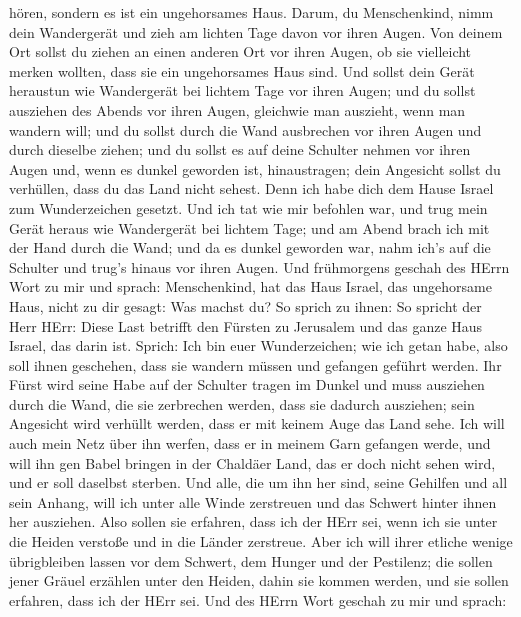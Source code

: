 hören, sondern es ist ein ungehorsames Haus.  Darum, du
Menschenkind, nimm dein Wandergerät und zieh am lichten Tage davon vor
ihren Augen. Von deinem Ort sollst du ziehen an einen anderen Ort vor
ihren Augen, ob sie vielleicht merken wollten, dass sie ein ungehorsames
Haus sind.  Und sollst dein Gerät heraustun wie Wandergerät
bei lichtem Tage vor ihren Augen; und du sollst ausziehen des Abends vor
ihren Augen, gleichwie man auszieht, wenn man wandern will; 
und du sollst durch die Wand ausbrechen vor ihren Augen und durch
dieselbe ziehen;  und du sollst es auf deine Schulter nehmen
vor ihren Augen und, wenn es dunkel geworden ist, hinaustragen; dein
Angesicht sollst du verhüllen, dass du das Land nicht sehest. Denn ich
habe dich dem Hause Israel zum Wunderzeichen gesetzt.  Und
ich tat wie mir befohlen war, und trug mein Gerät heraus wie Wandergerät
bei lichtem Tage; und am Abend brach ich mit der Hand durch die Wand;
und da es dunkel geworden war, nahm ich's auf die Schulter und trug's
hinaus vor ihren Augen.  Und frühmorgens geschah des HErrn
Wort zu mir und sprach:  Menschenkind, hat das Haus Israel,
das ungehorsame Haus, nicht zu dir gesagt: Was machst du? 
So sprich zu ihnen: So spricht der Herr HErr: Diese Last betrifft den
Fürsten zu Jerusalem und das ganze Haus Israel, das darin ist.
 Sprich: Ich bin euer Wunderzeichen; wie ich getan habe,
also soll ihnen geschehen, dass sie wandern müssen und gefangen geführt
werden.  Ihr Fürst wird seine Habe auf der Schulter tragen
im Dunkel und muss ausziehen durch die Wand, die sie zerbrechen werden,
dass sie dadurch ausziehen; sein Angesicht wird verhüllt werden, dass er
mit keinem Auge das Land sehe.  Ich will auch mein Netz
über ihn werfen, dass er in meinem Garn gefangen werde, und will ihn gen
Babel bringen in der Chaldäer Land, das er doch nicht sehen wird, und er
soll daselbst sterben.  Und alle, die um ihn her sind,
seine Gehilfen und all sein Anhang, will ich unter alle Winde zerstreuen
und das Schwert hinter ihnen her ausziehen.  Also sollen
sie erfahren, dass ich der HErr sei, wenn ich sie unter die Heiden
verstoße und in die Länder zerstreue.  Aber ich will ihrer
etliche wenige übrigbleiben lassen vor dem Schwert, dem Hunger und der
Pestilenz; die sollen jener Gräuel erzählen unter den Heiden, dahin sie
kommen werden, und sie sollen erfahren, dass ich der HErr sei.
 Und des HErrn Wort geschah zu mir und sprach:
